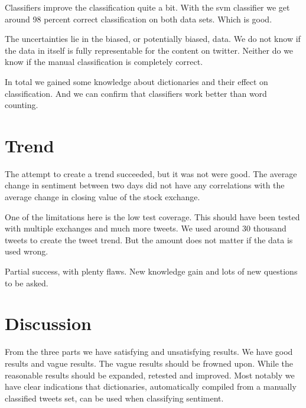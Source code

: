 Classifiers  improve the classification quite a bit. With the svm classifier we
get around 98 percent correct classification on both data sets. Which is good.

The uncertainties lie in the biased, or potentially biased, data. We do not
know if the data in itself is fully representable for the content on twitter.
Neither do we know if the manual classification is completely correct. 

In total we gained some knowledge about dictionaries and their effect on
classification. And we can confirm that classifiers work better than word
counting.  
%

\section{Trend}
The attempt to create a trend succeeded, but it was not were good. The average
change in sentiment between two days did not have any correlations with the
average change in closing value of the stock exchange. 

One of the limitations here is the low test coverage. This should have been
tested with multiple exchanges and much more tweets. We used around 30 thousand
tweets to create the tweet trend. But the amount does not matter if the data is
used wrong.  

Partial success, with plenty flaws. New knowledge gain and lots of new
questions to be asked. 
%

\section{Discussion}
From the three parts we have satisfying and unsatisfying results. We have good
results and vague results. The vague results should be frowned upon. While the
reasonable results should be expanded, retested and improved. 
Most notably we have clear indications that dictionaries, automatically compiled
from a manually classified tweets set, can be used when classifying sentiment. 
%
